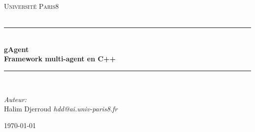 \documentclass[a4paper]{article}
\begin{document}
\newcommand{\HRule}{\rule{\linewidth}{0.5mm}}

\begin{titlepage}
\begin{center}


\textsc{\LARGE Université Paris8}\\[1.5cm]

\textsc{\Large }\\[0.5cm]

\HRule \\[0.4cm]

{\huge \bfseries gAgent \\
Framework multi-agent en C++ \\[0.4cm] }

\HRule \\[1.5cm]

\begin{minipage}{0.4\textwidth}
\begin{flushleft} \large
\emph{Auteur:}\\
Halim Djerroud \textit{hdd@ai.univ-paris8.fr}\\
\end{flushleft}
\end{minipage}


\vfill

{\large \today}

\end{center}
\end{titlepage}





\tableofcontents
\thispagestyle{empty}
\setcounter{page}{0}

\newpage

\renewcommand{\arraystretch}{1.5}





\nocite{*}


%
\end{document}

